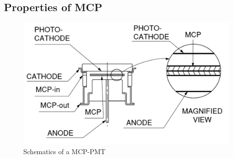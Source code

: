\subsection{Properties of MCP}
\begin{figure}[htbp]
\begin{center}
\includegraphics[width=12cm]{../Pictures/Chapter_3/MCP_struct}
\end{center}
\caption[MCP schematics]{Schematics of a MCP-PMT}
\label{fig:MCP_struct}
\end{figure}
